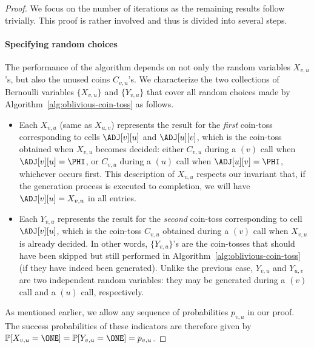 \begin{proof}
We focus on the number of iterations as the remaining results follow trivially. This proof is rather involved and thus is divided into several steps.

\paragraph*{Specifying random choices} The performance of the algorithm depends on not only the random variables $X_{v,u}$'s, but also the unused coins $C_{v,u}$'s. We characterize the two collections of Bernoulli variables $\{X_{v,u}\}$ and $\{Y_{v,u}\}$ that cover all random choices made by Algorithm~\ref{alg:oblivious-coin-toss} as follows.

\begin{itemize}
\item Each $X_{v,u}$ (same as $X_{u,v}$) represents the result for the \emph{first} coin-toss corresponding to cells $\ADJ[v][u]$ and $\ADJ[u][v]$, which is the coin-toss obtained when $X_{v,u}$ becomes decided: either $C_{v,u}$ during a $(v)$ call when $\ADJ[v][u] = \PHI$, or $C_{v,u}$ during a $(u)$ call when $\ADJ[u][v] = \PHI$, whichever occurs first.
This description of $X_{v,u}$ respects our invariant that, if the generation process is executed to completion, we will have $\ADJ[v][u]=X_{v,u}$ in all entries.
\item Each $Y_{v,u}$ represents the result for the \emph{second} coin-toss corresponding to cell $\ADJ[v][u]$, which is the coin-toss $C_{v,u}$ obtained during a $(v)$ call when $X_{v,u}$ is already decided. In other words, $\{Y_{v,u}\}$'s are the coin-tosses that should have been skipped but still performed in Algorithm~\ref{alg:oblivious-coin-toss} (if they have indeed been generated). Unlike the previous case, $Y_{v,u}$ and $Y_{u,v}$ are two independent random variables: they may be generated during a $(v)$ call and a $(u)$ call, respectively.
\end{itemize}
As mentioned earlier, we allow any sequence of probabilities $p_{v,u}$ in our proof. The success probabilities of these indicators are therefore given by $\mathbb P[X_{v,u}=\ONE] = \mathbb P[Y_{v,u}=\ONE] = p_{v,u}$.


\end{proof}
